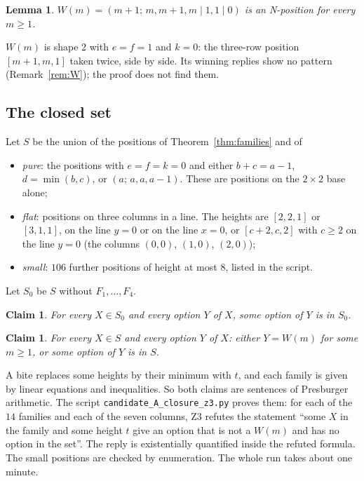 \documentclass[11pt]{amsart}
\newtheorem{lemma}[theorem]{Lemma}
\newtheorem{claim}[theorem]{Claim}
\theoremstyle{definition}
\theoremstyle{remark}
\begin{document}
\begin{lemma}\label{lem:W}
$W(m)=(m+1;\,m,m+1,m\mid1,1\mid0)$ is an N-position for every $m\ge1$.
\end{lemma}

$W(m)$ is shape 2 with $e=f=1$ and $k=0$: the three-row position $[m+1,m,1]$ taken twice, side
by side. Its winning replies show no pattern (Remark~\ref{rem:W}); the proof does not find
them.

\subsection{The closed set}
Let $S$ be the union of the positions of Theorem~\ref{thm:families} and of
\begin{itemize}
\item \emph{pure}: the positions with $e=f=k=0$ and either $b+c=a-1$, $d=\min(b,c)$, or
$(a;\,a,a,a-1)$. These are positions on the $2\times2$ base alone;
\item \emph{flat}: positions on three columns in a line. The heights are $[2,2,1]$ or
$[3,1,1]$, on the line $y=0$ or on the line $x=0$, or $[c+2,c,2]$ with $c\ge2$ on the line
$y=0$ (the columns $(0,0)$, $(1,0)$, $(2,0)$);
\item \emph{small}: $106$ further positions of height at most $8$, listed in the script.
\end{itemize}
Let $S_0$ be $S$ without $F_1,\dots,F_4$.

\begin{claim}\label{cl:S0}
For every $X\in S_0$ and every option $Y$ of $X$, some option of $Y$ is in $S_0$.
\end{claim}
\begin{claim}\label{cl:S}
For every $X\in S$ and every option $Y$ of $X$: either $Y=W(m)$ for some $m\ge1$, or some
option of $Y$ is in $S$.
\end{claim}

A bite replaces some heights by their minimum with $t$, and each family is given by linear
equations and inequalities. So both claims are sentences of Presburger arithmetic. The script
\texttt{candidate\_A\_closure\_z3.py} proves them: for each of the $14$ families and each of
the seven columns, Z3 refutes the statement ``some $X$ in the family and some height $t$ give
an option that is not a $W(m)$ and has no option in the set''. The reply is existentially
quantified inside the refuted formula. The small positions are checked by enumeration. The
whole run takes about one minute.
\end{document}
